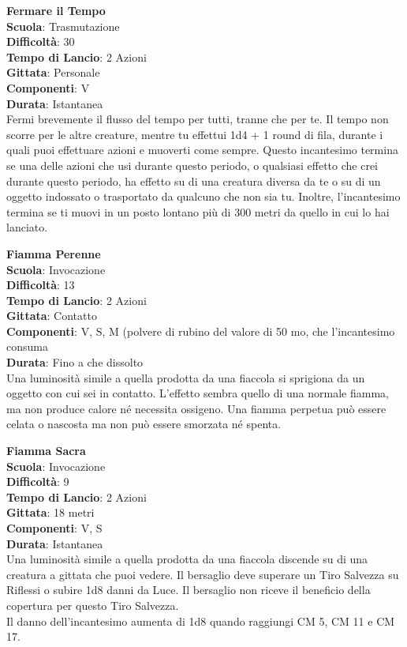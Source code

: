 \begin{multicols}{2}
\medskip\textbf{Fermare il Tempo}\\
\textbf{Scuola}: Trasmutazione\\
\textbf{Difficoltà}:  30\\
\textbf{Tempo di Lancio}: 2 Azioni\\
\textbf{Gittata}: Personale\\
\textbf{Componenti}: V\\
\textbf{Durata}: Istantanea\\
Fermi brevemente il flusso del tempo per tutti, tranne che per te. Il tempo non scorre per le altre creature,  mentre tu effettui 1d4 + 1 round  di fila, durante i quali puoi effettuare azioni e muoverti come sempre. Questo incantesimo termina se una delle azioni che usi durante questo periodo, o qualsiasi effetto che crei durante questo periodo, ha effetto su di una creatura diversa da te o su di un oggetto indossato o trasportato da qualcuno che non sia tu. Inoltre, l'incantesimo termina se ti muovi in un posto lontano più di 300 metri da quello in cui lo hai lanciato.

\medskip\textbf{Fiamma Perenne}\\
\textbf{Scuola}: Invocazione\\
\textbf{Difficoltà}:  13\\
\textbf{Tempo di Lancio}: 2 Azioni\\
\textbf{Gittata}: Contatto\\
\textbf{Componenti}: V, S, M (polvere di rubino del valore di 50 mo, che l'incantesimo consuma\\ \textbf{Durata}: Fino a che dissolto\\
Una luminosità simile a quella prodotta da una fiaccola si sprigiona da un oggetto con cui sei in contatto. L’effetto sembra quello di una normale fiamma, ma non produce calore né necessita ossigeno. Una fiamma perpetua può essere celata o nascosta ma non può essere smorzata né spenta.

\medskip\textbf{Fiamma Sacra}\\
\textbf{Scuola}: Invocazione\\
\textbf{Difficoltà}:  9\\
\textbf{Tempo di Lancio}: 2 Azioni\\
\textbf{Gittata}: 18 metri\\
\textbf{Componenti}: V, S\\
\textbf{Durata}: Istantanea\\
Una luminosità simile a quella prodotta da una fiaccola discende su di una creatura a gittata che puoi vedere. Il bersaglio deve superare un Tiro Salvezza su Riflessi o subire 1d8 danni da Luce. Il bersaglio non riceve il beneficio della copertura per questo Tiro Salvezza.\\
Il danno dell'incantesimo aumenta di 1d8 quando raggiungi CM 5, CM 11 e CM 17.


\end{multicols}
